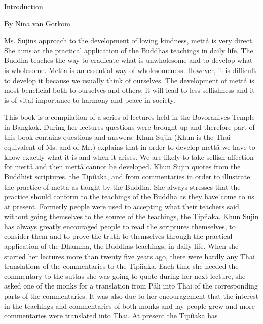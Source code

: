 \documentclass[12pt,twoside]{article}
\begin{document}
Introduction


\bigskip

By Nina van Gorkom


\bigskip

Ms. Sujin{\textquotesingle}s approach to the development of loving
kindness, mett{\aa} is very direct. She aims at the practical
application of the Buddha{\textquotesingle}s teachings in daily life.
The Buddha teaches the way to eradicate what is unwholesome and to
develop what is wholesome. Mett{\aa} is an essential way of
wholesomeness. However, it is difficult to develop it because we
usually think of ourselves. The development of mett{\aa} is most
beneficial both to ourselves and others: it will lead to less
selfishness and it is of vital importance to harmony and peace in
society. 

This book is a compilation of a series of lectures held in the
Bovoranives Temple in Bangkok. During her lectures questions were
brought up and therefore part of this book contains questions and
answers. Khun Sujin
({\textasciigrave}{\textasciigrave}Khun{\textquotesingle}{\textquotesingle}
is the Thai equivalent of Ms. and of Mr.) explains that in order to
develop mett{\aa} we have to know exactly what it is and when it
arises. We are likely to take selfish affection for mett{\aa} and then
mett{\aa} cannot be developed. Khun Sujin quotes from the Buddhist
scriptures, the
{\textasciigrave}{\textasciigrave}Tipi\`iaka{\textquotesingle}{\textquotesingle},
and from commentaries in order to illustrate the practice of mett{\aa}
as taught by the Buddha. She always stresses that the practice should
conform to the teachings of the Buddha as they have come to us at
present. Formerly people were used to accepting what their teachers
said without going themselves to the source of the teachings, the
Tipi\`iaka. Khun Sujin has always greatly encouraged people to read the
scriptures themselves, to consider them and to prove the truth to
themselves through the practical application of the Dhamma, the
Buddha{\textquotesingle}s teachings, in daily life. When she started
her lectures more than twenty five years ago, there were hardly any
Thai translations of the commentaries to the Tipi\`iaka. Each time she
needed the commentary to the suttas she was going to quote during her
next lecture, she asked one of the monks for a translation from
P{\aa}li into Thai of the corresponding parts of the commentaries. It
was also due to her encouragement that the interest in the teachings
and commentaries of both monks and lay people grew and more
commentaries were translated into Thai. At present the Tipi\`iaka has
\end{document}
